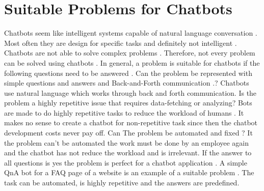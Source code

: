 \section{Suitable Problems for Chatbots} 
Chatbots seem like intelligent systems capable of natural language conversation \cite{buiildChatbotsPython}.
Most often they are design for specific tasks and definitely not intelligent \cite{buiildChatbotsPython}.
Chatbots are not able to solve complex problems \cite{buiildChatbotsPython}.
Therefore, not every problem can be solved using chatbots \cite{buiildChatbotsPython}.
In general, a problem is suitable for chatbots if the following questions need to be answered \cite{buiildChatbotsPython}.
Can the problem be represented with simple questions and answers and Back-and-Forth communication \cite{buiildChatbotsPython}.?
Chatbots use natural language which works through back and forth communication.
Is the problem a highly repetitive issue that requires data-fetching or analyzing? 
Bots are made to do highly repetitive tasks to reduce the workload of humans \cite{buiildChatbotsPython}.
It makes no sense to create a chatbot for non-repetitive task since then the chatbot development costs never pay off. 
Can The problem be automated and fixed \cite{buiildChatbotsPython}?
It the problem can't be automated the work must be done by an employee again and the chatbot has not reduce the workload and is irrelevant.
If the answer to all questions is yes the problem is perfect for a chatbot application \cite{buiildChatbotsPython}.
A simple QnA bot for a FAQ page of a website is an example of a suitable problem \cite{buiildChatbotsPython}.
The task can be automated, is highly repetitive and the answers are predefined.






